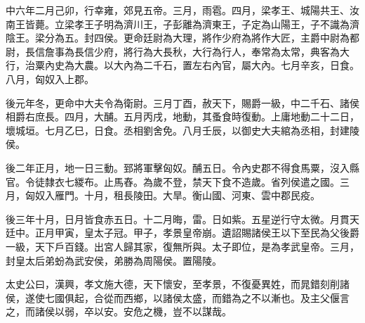 中六年二月己卯，行幸雍，郊見五帝。三月，雨雹。四月，梁孝王、城陽共王、汝南王皆薨。立梁孝王子明為濟川王，子彭離為濟東王，子定為山陽王，子不識為濟陰王。梁分為五。封四侯。更命廷尉為大理，將作少府為將作大匠，主爵中尉為都尉，長信詹事為長信少府，將行為大長秋，大行為行人，奉常為太常，典客為大行，治粟內史為大農。以大內為二千石，置左右內官，屬大內。七月辛亥，日食。八月，匈奴入上郡。

後元年冬，更命中大夫令為衛尉。三月丁酉，赦天下，賜爵一級，中二千石、諸侯相爵右庶長。四月，大酺。五月丙戌，地動，其蚤食時復動。上庸地動二十二日，壞城垣。七月乙巳，日食。丞相劉舍免。八月壬辰，以御史大夫綰為丞相，封建陵侯。

後二年正月，地一日三動。郅將軍擊匈奴。酺五日。令內史郡不得食馬粟，沒入縣官。令徒隸衣七緵布。止馬舂。為歲不登，禁天下食不造歲。省列侯遣之國。三月，匈奴入雁門。十月，租長陵田。大旱。衡山國、河東、雲中郡民疫。

後三年十月，日月皆食赤五日。十二月晦，雷。日如紫。五星逆行守太微。月貫天廷中。正月甲寅，皇太子冠。甲子，孝景皇帝崩。遺詔賜諸侯王以下至民為父後爵一級，天下戶百錢。出宮人歸其家，復無所與。太子即位，是為孝武皇帝。三月，封皇太后弟蚡為武安侯，弟勝為周陽侯。置陽陵。

太史公曰，漢興，孝文施大德，天下懷安，至孝景，不復憂異姓，而晁錯刻削諸侯，遂使七國俱起，合從而西鄉，以諸侯太盛，而錯為之不以漸也。及主父偃言之，而諸侯以弱，卒以安。安危之機，豈不以謀哉。